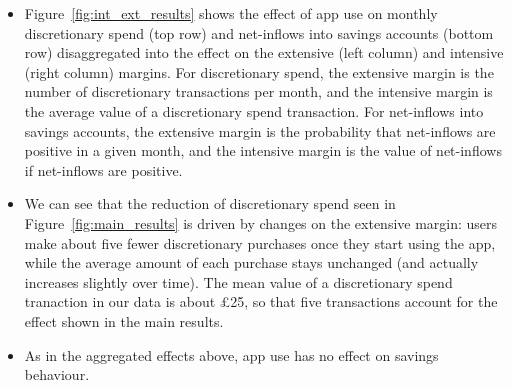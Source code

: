 \begin{itemize}

    \item Figure~\ref{fig:int_ext_results} shows the effect of app use on
        monthly discretionary spend (top row) and net-inflows into savings
        accounts (bottom row) disaggregated into the effect on the extensive
        (left column) and intensive (right column) margins. For discretionary
        spend, the extensive margin is the number of discretionary transactions
        per month, and the intensive margin is the average value of a
        discretionary spend transaction. For net-inflows into savings accounts,
        the extensive margin is the probability that net-inflows are positive
        in a given month, and the intensive margin is the value of net-inflows
        if net-inflows are positive.

    \item We can see that the reduction of discretionary spend seen in
        Figure~\ref{fig:main_results} is driven by changes on the extensive
        margin: users make about five fewer discretionary purchases once they
        start using the app, while the average amount of each purchase stays
        unchanged (and actually increases slightly over time). The mean value
        of a discretionary spend tranaction in our data is about \pounds25, so
        that five transactions account for the effect shown in the main
        results.

    \item As in the aggregated effects above, app use has no effect on savings
        behaviour.

\end{itemize}

